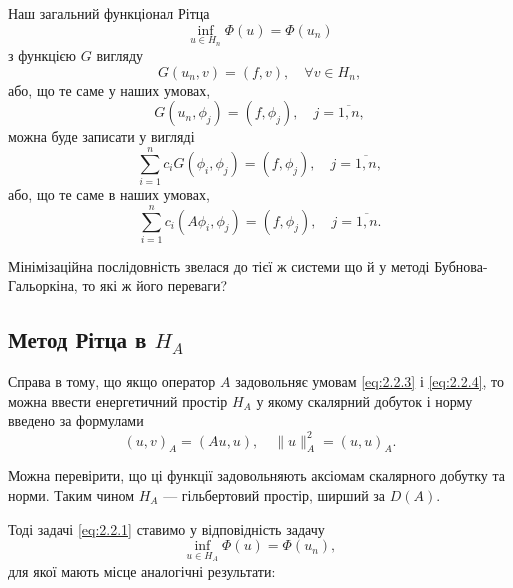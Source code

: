 Наш загальний функціонал Рітца
\begin{equation}
    \label{eq:2.2.5}
    \inf_{u \in H_n} \Phi(u) = \Phi(u_n)
\end{equation}
з функцією $G$ вигляду
\begin{equation}
    \label{eq:2.2.6}
    G(u_n, v) = (f, v), \quad \forall v \in H_n,
\end{equation}
або, що те саме у наших умовах,
\begin{equation}
    \label{eq:2.2.7}
    G(u_n, \phi_j) = (f, \phi_j), \quad j = \overline{1, n},
\end{equation}
можна буде записати у вигляді
\begin{equation}
    \label{eq:2.2.8}
    \sum_{i = 1}^n c_i G(\phi_i, \phi_j) = (f, \phi_j), \quad j = \overline{1, n},
\end{equation}
або, що те саме в наших умовах,
\begin{equation}
    \label{eq:2.2.9}
    \sum_{i = 1}^n c_i (A \phi_i, \phi_j) = (f, \phi_j), \quad j = \overline{1, n}.
\end{equation}

Мінімізаційна послідовність звелася до тієї ж системи що й у методі Бубнова-Гальоркіна, то які ж його переваги?

\subsection{Метод Рітца в \texorpdfstring{$H_A$}{HA}}

Справа в тому, що якщо оператор $A$ задовольняє умовам \eqref{eq:2.2.3} і \eqref{eq:2.2.4}, то можна ввести енергетичний простір $H_A$ у якому скалярний добуток і норму введено за формулами
\begin{equation}
    \label{eq:2.3.1}
    (u, v)_A = (A u, u), \quad \|u\|_A^2 = (u, u)_A.
\end{equation}

Можна перевірити, що ці функції задовольняють аксіомам скалярного добутку та норми. Таким чином $H_A$ --- гільбертовий простір, ширший за $D(A)$. \medskip

Тоді задачі \eqref{eq:2.2.1} ставимо у відповідність задачу
\begin{equation}
    \label{eq:2.3.2}
    \inf_{u \in H_A} \Phi(u) = \Phi(u_n),
\end{equation}
для якої мають місце аналогічні результати:

